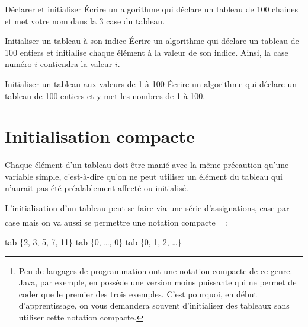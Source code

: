 		\begin{Exercice}{Déclarer et initialiser}
			Écrire un algorithme qui déclare un tableau de 100 chaines
			et met votre nom dans la 3\ieme{} case du tableau.
		\end{Exercice}
	
		\begin{Exercice}{Initialiser un tableau à son indice}
			Écrire un algorithme qui déclare un tableau de 100 entiers
			et initialise chaque élément à la valeur de son indice.
			Ainsi, la case numéro $i$ contiendra la valeur $i$.
		\end{Exercice}

		\begin{Exercice}{Initialiser un tableau aux valeurs de 1 à 100}
			Écrire un algorithme qui déclare un tableau de 100 entiers
			et y met les nombres de 1 à 100.
		\end{Exercice}
		
	\section{Initialisation compacte}

		Chaque élément d’un tableau
		doit être manié avec la même précaution 
		qu’une variable simple, 
		c’est-à-dire qu’on ne peut utiliser un élément du tableau 
		qui n’aurait pas été préalablement affecté ou initialisé.

		L’initialisation d’un tableau peut se faire 
		via une série d’assignations, case par case
		mais on va aussi se permettre une notation compacte%
		\footnote{
			Peu de langages de programmation 
			ont une notation compacte de ce genre. 
			Java, par exemple, en possède une version moins puissante
			qui ne permet de coder que le premier des trois exemples.
			C’est pourquoi, en début d’apprentissage, 
			on vous demandera souvent d’initialiser des tableaux
			sans utiliser cette notation compacte.
		}~:
		
		\begin{LDA}
			\Let tab \Gets \{2, 3, 5, 7, 11\} 
			\Let tab \Gets \{0, \dots, 0\} 
			\Let tab \Gets \{0, 1, 2, \dots\} 
		\end{LDA}



